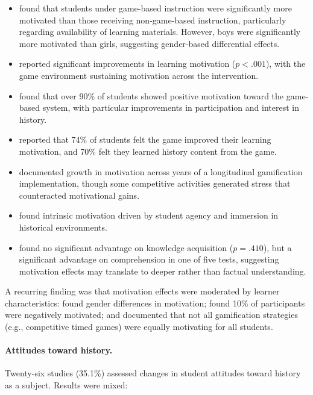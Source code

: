 \documentclass[a4paper,fleqn]{cas-sc}
\begin{document}
\begin{itemize}[noitemsep]
 \item \citet{8Yu2014} found that students under game-based instruction were significantly more motivated than those receiving non-game-based instruction, particularly regarding availability of learning materials. However, boys were significantly more motivated than girls, suggesting gender-based differential effects.
 \item \citet{9Lin2018} reported significant improvements in learning motivation ($p<.001$), with the game environment sustaining motivation across the intervention.
 \item \citet{52Lin2011265} found that over 90\% of students showed positive motivation toward the game-based system, with particular improvements in participation and interest in history.
 \item \citet{47Clara2010156} reported that 74\% of students felt the game improved their learning motivation, and 70\% felt they learned history content from the game.
 \item \citet{34Serrano2023} documented growth in motivation across years of a longitudinal gamification implementation, though some competitive activities generated stress that counteracted motivational gains.
 \item \citet{46Stirling2022} found intrinsic motivation driven by student agency and immersion in historical environments.
 \item \citet{76Corbeil2011462} found no significant advantage on knowledge acquisition ($p=.410$), but a significant advantage on comprehension in one of five tests, suggesting motivation effects may translate to deeper rather than factual understanding.
\end{itemize}

A recurring finding was that motivation effects were moderated by learner characteristics: \citet{8Yu2014} found gender differences in motivation; \citet{6Czerwinski2018} found 10\% of participants were negatively motivated; and \citet{34Serrano2023} documented that not all gamification strategies (e.g., competitive timed games) were equally motivating for all students.

\paragraph{Attitudes toward history.}

Twenty-six studies (35.1\%) assessed changes in student attitudes toward history as a subject. Results were mixed:
\end{document}
